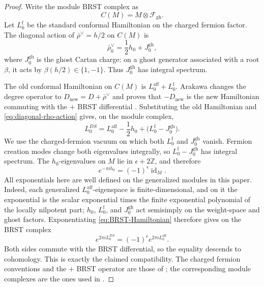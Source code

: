 \documentclass[12pt,leqno]{amsart}
\numberwithin{equation}{section}
\newcommand{\id}{\operatorname{id}}
\def\Z{\mathbb{Z}}
\begin{document}
\begin{proof}
Write the module BRST complex as
\[
 C(M)=M\otimes\mathcal F_{\mathrm{gh}}.
\]
Let $L^{\mathrm f}_0$ be the standard conformal Hamiltonian on the charged
fermion factor.  The diagonal action of
$\bar\rho^\vee=h/2$ on $C(M)$ is
\begin{equation}\label{eq:diagonal-rho-action}
 \bar\rho^\vee_0=\frac12h_0+J^{\mathrm{gh}}_0,
\end{equation}
where $J^{\mathrm{gh}}_0$ is the ghost Cartan charge: on a ghost generator
associated with a root $\beta$, it acts by
$\beta(h/2)\in\{1,-1\}$.  Thus $J^{\mathrm{gh}}_0$ has integral spectrum.

The old conformal Hamiltonian on $C(M)$ is
$L^{\mathrm{aff}}_0+L^{\mathrm f}_0$.  Arakawa changes the degree operator
to $D_{\mathrm{new}}=D+\bar\rho^\vee$ and proves that
$-D_{\mathrm{new}}$ is the new Hamiltonian commuting with the $+$ BRST
differential \cite[(169)--(173), Section~4.6]{ArakawaW}.  Substituting the
old Hamiltonian and \eqref{eq:diagonal-rho-action} gives, on the module
complex,
\begin{equation}\label{eq:BRST-Hamiltonian}
 L^{DS}_0=L^{\mathrm{aff}}_0-\frac12h_0+
 \bigl(L^{\mathrm f}_0-J^{\mathrm{gh}}_0\bigr).
\end{equation}
We use the charged-fermion vacuum on which both $L^{\mathrm f}_0$ and
$J^{\mathrm{gh}}_0$ vanish.  Fermion creation modes change both eigenvalues
integrally, so $L^{\mathrm f}_0-J^{\mathrm{gh}}_0$ has integral spectrum.
The $h_0$-eigenvalues on $M$ lie in
$\epsilon+2\Z$, and therefore
\[
 e^{-\pi ih_0}=(-1)^\epsilon\id_M.
\]
All exponentials here are well defined on the generalized modules in this
paper.  Indeed, each generalized $L^{\mathrm{aff}}_0$-eigenspace is
finite-dimensional, and on it the exponential is the scalar exponential
times the finite exponential polynomial of the locally nilpotent part;
$h_0$, $L^{\mathrm f}_0$, and $J^{\mathrm{gh}}_0$ act semisimply on the
weight-space and ghost factors.  Exponentiating
\eqref{eq:BRST-Hamiltonian} therefore gives on the BRST complex
\[
 e^{2\pi iL^{DS}_0}=(-1)^\epsilon e^{2\pi iL^{\mathrm{aff}}_0}.
\]
Both sides commute with the BRST differential, so the equality descends to
cohomology.  This is exactly the claimed compatibility.  The charged
fermion conventions and the $+$ BRST operator are those of
\cite[(154), (166)--(168)]{ArakawaW}; the corresponding module complexes are
the ones used in \cite{ArakawaVanishing}.
\end{proof}
\end{document}
